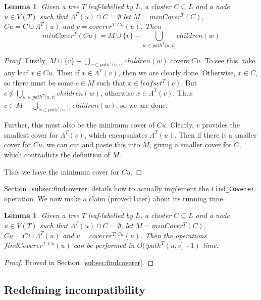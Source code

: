 \documentclass[final,1p,times]{elsarticle}
\newcommand{\leafset}{\Lambda}
\newtheorem{lemma}[theorem]{Lemma}
\begin{document}
    \begin{lemma}
        \label{lem:mincoverrecursive}
        Given a tree $T$ leaf-labelled by $L$, a cluster $C \subseteq L$ and a node $u \in V(T)$ such that $\leafset^{T}(u) \cap C = \emptyset$ let $M = minCover^{T}(C)$, $Cu = C \cup \leafset^{T}(u)$ and $v = coverer^{T, Cu}(u)$. Then
         \[minCover^{T}(Cu) = M \cup \{v\} - \bigcup_{w \in path^{T}(u, v]} children(w)\]
    \end{lemma}
        \begin{proof}
            Firstly, $M \cup \{v\} - \bigcup_{w \in path^{T}(u, v]} children(w)$ covers $Cu$. To see this, take any leaf $x \in Cu$. Then if $x \in \leafset^{T}(v)$, then we are clearly done. Otherwise, $x \in C$, so there must be some $c \in M$ such that $x \in leafset^{T}(c)$. But $c \not\in \bigcup_{w \in path^{T}(u, v]} children(w)$, otherwise $x \in \leafset^{T}(v)$. Thus $c \in M - \bigcup_{w \in path^{T}(u, v]} children(w)$, so we are done.

            Further, this must also be the minimum cover of $Cu$. Clearly, $v$ provides the smallest cover for $\leafset^{T}(v)$, which encapsulates $\leafset^{T}(u)$. Then if there is a smaller cover for $Cu$, we can cut and paste this into $M$, giving a smaller cover for $C$, which contradicts the definition of $M$.

            Thus we have the minimum cover for $Cu$.
        \end{proof}

    Section~\ref{subsec:findcoverer} details how to actually implement the \texttt{Find\_Coverer} operation. We now make a claim (proved later) about its running time.
    \newline

    \begin{lemma}
        \label{lem:findcovererruntime}
        Given a tree $T$ leaf-labelled by $L$, a cluster $C \subseteq L$ and a node $u \in V(T)$ such that $\leafset^{T}(u) \cap C = \emptyset$, let $M = minCover^{T}(C)$, $Cu = C \cup \leafset^{T}(u)$ and $v = coverer^{T, Cu}(u)$. Then the operations $findCoverer^{T, Cu}(u)$ can be performed in $O(|path^{T}(u, v]| + 1)$ time.
    \end{lemma}
        \begin{proof}
            Proved in Section~\ref{subsec:findcoverer}.
        \end{proof}

    \subsection{Redefining incompatibility}
    \label{subsec:redefiningincompatibility}
\end{document}
